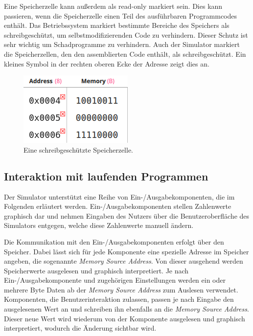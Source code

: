 Eine Speicherzelle kann außerdem als read-only markiert sein. Dies kann
passieren, wenn die Speicherzelle einen Teil des ausführbaren Programmcodes
enthält. Das Betriebssystem markiert bestimmte Bereiche des Speichers als
schreibgeschützt, um selbstmodifizierenden Code zu verhindern. Dieser Schutz ist
sehr wichtig um Schadprogramme zu verhindern. Auch der Simulator markiert die
Speicherzellen, den den assemblierten Code enthält, als schreibgeschützt. Ein
kleines Symbol in der rechten oberen Ecke der Adresse zeigt dies an.

\begin{figure}[ht]
	\centering
  \includegraphics[scale=1]{Images/Memory_writeprotected}
	\caption{Eine schreibgeschützte Speicherzelle.}
	\label{Memory_writeprotected}
\end{figure}


\subsection{Interaktion mit laufenden Programmen}

Der Simulator unterstützt eine Reihe von Ein-/Ausgabekomponenten, die im
Folgenden erläutert werden. Ein-/Ausgabekomponenten stellen Zahlenwerte
graphisch dar und nehmen Eingaben des Nutzers über die Benutzeroberfläche des
Simulators entgegen, welche diese Zahlenwerte manuell ändern.

Die Kommunikation mit den Ein-/Ausgabekomponenten erfolgt über den Speicher.
Dabei lässt sich für jede Komponente eine spezielle Adresse im Speicher angeben,
die sogenannte \emph{Memory Source Address}. Von dieser ausgehend werden
Speicherwerte ausgelesen und graphisch interpretiert. Je nach
Ein-/Ausgabekomponente und zugehörigen Einstellungen werden ein oder mehrere
Byte Daten ab der \emph{Memory Source Address} zum Auslesen verwendet.
Komponenten, die Benutzerinteraktion zulassen, passen je nach Eingabe den
ausgelesenen Wert an und schreiben ihn ebenfalls an die \emph{Memory Source
Address}. Dieser neue Wert wird wiederum von der Komponente ausgelesen und
graphisch interpretiert, wodurch die Änderung sichtbar wird.

